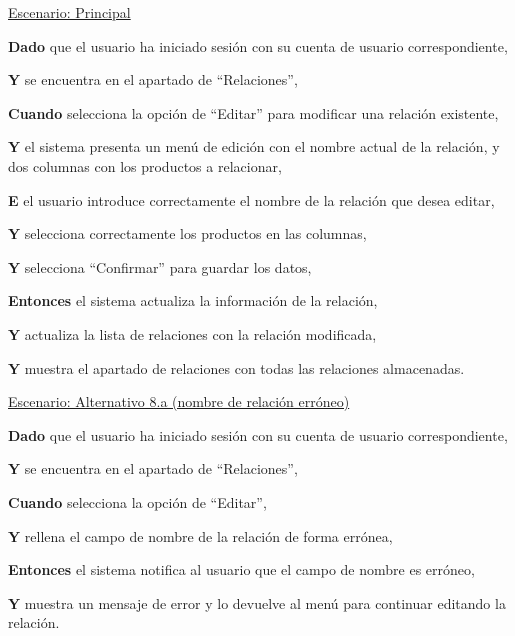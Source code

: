 \underline{Escenario: Principal}\par
\vspace{0.15cm}
\textbf{Dado} que el usuario ha iniciado sesión con su cuenta de usuario correspondiente,\par
\textbf{Y} se encuentra en el apartado de \enquote{Relaciones},\par
\textbf{Cuando} selecciona la opción de \enquote{Editar} para modificar una relación existente,\par
\textbf{Y} el sistema presenta un menú de edición con el nombre actual de la relación, y dos columnas con los productos a relacionar,\par
\textbf{E} el usuario introduce correctamente el nombre de la relación que desea editar,\par
\textbf{Y} selecciona correctamente los productos en las columnas,\par
\textbf{Y} selecciona \enquote{Confirmar} para guardar los datos,\par
\textbf{Entonces} el sistema actualiza la información de la relación,\par
\textbf{Y} actualiza la lista de relaciones con la relación modificada,\par
\textbf{Y} muestra el apartado de relaciones con todas las relaciones almacenadas.\par

\vspace{0.20cm}

\underline{Escenario: Alternativo 8.a (nombre de relación erróneo)}\par
\vspace{0.15cm}

\textbf{Dado} que el usuario ha iniciado sesión con su cuenta de usuario correspondiente,\par
\textbf{Y} se encuentra en el apartado de \enquote{Relaciones},\par
\textbf{Cuando} selecciona la opción de \enquote{Editar},\par
\textbf{Y} rellena el campo de nombre de la relación de forma errónea,\par
\textbf{Entonces} el sistema notifica al usuario que el campo de nombre es erróneo,\par
\textbf{Y} muestra un mensaje de error y lo devuelve al menú para continuar editando la relación.\par

\vspace{0.20cm}

